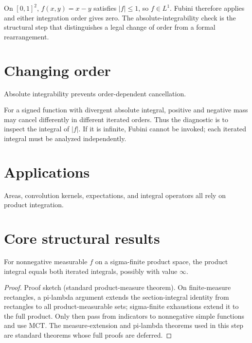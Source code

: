 \begin{example}\label{ex:iii05-expand-02}
On \([0,1]^2\), \(f(x,y)=x-y\) satisfies \(|f|\le1\), so \(f\in L^1\).
Fubini therefore applies and either integration order gives zero. The
absolute-integrability check is the structural step that distinguishes a legal
change of order from a formal rearrangement.
\end{example}
\section{Changing order}
Absolute integrability prevents order-dependent cancellation.


\begin{example}\label{ex:iii05-expand-03}
For a signed function with divergent absolute integral, positive and negative
mass may cancel differently in different iterated orders. Thus the diagnostic
is to inspect the integral of \(|f|\). If it is infinite, Fubini cannot be
invoked; each iterated integral must be analyzed independently.
\end{example}
\section{Applications}
Areas, convolution kernels, expectations, and integral operators all rely on product integration.

\section{Core structural results}

\begin{theorem}\label{thm:iii05-01}
For nonnegative measurable $f$ on a sigma-finite product space, the product integral equals both iterated integrals, possibly with value $\infty$.
\begin{proof}
Proof sketch (standard product-measure theorem). On finite-measure rectangles, a pi-lambda argument extends the section-integral identity from rectangles to all product-measurable sets; sigma-finite exhaustions extend it to the full product. Only then pass from indicators to nonnegative simple functions and use MCT. The measure-extension and pi-lambda theorems used in this step are standard theorems whose full proofs are deferred.
\end{proof}
\end{theorem}


